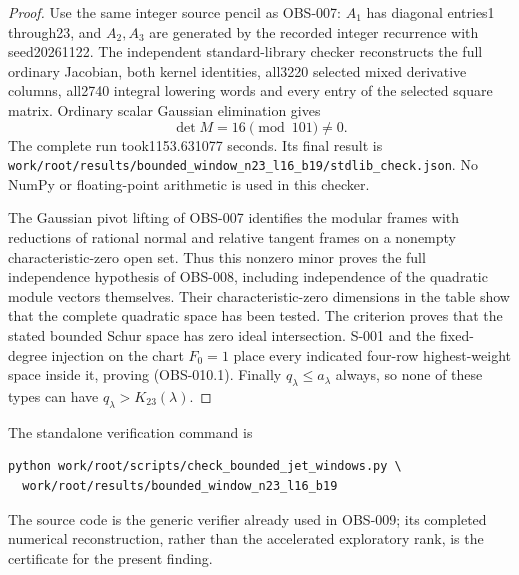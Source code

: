\begin{proof}
Use the same integer source pencil as OBS-007: $A_1$ has diagonal
entries1 through23, and $A_2,A_3$ are generated by the recorded
integer recurrence with seed20261122. The independent standard-library
checker reconstructs the full ordinary Jacobian, both kernel identities,
all3220 selected mixed derivative columns, all2740 integral lowering
words and every entry of the selected square matrix. Ordinary scalar
Gaussian elimination gives
\[
                         \det M=16\pmod {101}\ne0.
\]
The complete run took1153.631077 seconds. Its final result is
\texttt{work/root/results/bounded\_window\_n23\_l16\_b19/stdlib\_check.json}.
No NumPy or floating-point arithmetic is used in this checker.

The Gaussian pivot lifting of OBS-007 identifies the modular frames
with reductions of rational normal and relative tangent frames on a
nonempty characteristic-zero open set. Thus this nonzero minor proves
the full independence hypothesis of OBS-008, including independence
of the quadratic module vectors themselves. Their characteristic-zero
dimensions in the table show that the complete quadratic space has
been tested. The criterion proves that the stated bounded Schur space
has zero ideal intersection. S-001 and the fixed-degree injection on
the chart $F_0=1$ place every indicated four-row highest-weight space
inside it, proving (OBS-010.1). Finally $q_\lambda\le a_\lambda$
always, so none of these types can have $q_\lambda>K_{23}(\lambda)$.
\end{proof}

The standalone verification command is
\begin{verbatim}
python work/root/scripts/check_bounded_jet_windows.py \
  work/root/results/bounded_window_n23_l16_b19
\end{verbatim}
The source code is the generic verifier already used in OBS-009;
its completed numerical reconstruction, rather than the accelerated
exploratory rank, is the certificate for the present finding.
